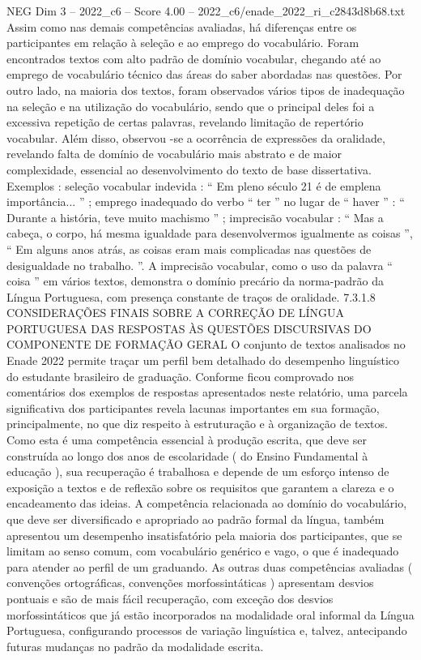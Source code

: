 \begin{textsample}{NEG Dim 3 – 2022\_c6 – Score 4.00 – 2022\_c6/enade\_2022\_ri\_c2843d8b68.txt}
Assim como nas demais competências avaliadas, há diferenças entre os participantes em relação à seleção e ao emprego do vocabulário.
Foram encontrados textos com alto padrão de domínio vocabular, chegando até ao emprego de vocabulário técnico das áreas do saber abordadas nas questões.
Por outro lado, na maioria dos textos, foram observados vários tipos de inadequação na seleção e na utilização do vocabulário, sendo que o principal deles foi a excessiva repetição de certas palavras, revelando limitação de repertório vocabular.
Além disso, observou -se a ocorrência de expressões da oralidade, revelando falta de domínio de vocabulário mais abstrato e de maior complexidade, essencial ao desenvolvimento do texto de base dissertativa.
Exemplos : seleção vocabular indevida : “ Em pleno século 21 é de emplena importância... ” ; emprego inadequado do verbo “ ter ” no lugar de “ haver ” : “ Durante a história, teve muito machismo ” ; imprecisão vocabular : “ Mas a cabeça, o corpo, há mesma igualdade para desenvolvermos igualmente as coisas ”, “ Em alguns anos atrás, as coisas eram mais complicadas nas questões de desigualdade no trabalho. ”.
A imprecisão vocabular, como o uso da palavra “ coisa ” em vários textos, demonstra o domínio precário da norma-padrão da Língua Portuguesa, com presença constante de traços de oralidade. 7.3.1.8 CONSIDERAÇÕES FINAIS SOBRE A CORREÇÃO DE LÍNGUA PORTUGUESA DAS RESPOSTAS ÀS QUESTÕES DISCURSIVAS DO COMPONENTE DE FORMAÇÃO GERAL O conjunto de textos analisados no Enade 2022 permite traçar um perfil bem detalhado do desempenho linguístico do estudante brasileiro de graduação.
Conforme ficou comprovado nos comentários dos exemplos de respostas apresentados neste relatório, uma parcela significativa dos participantes revela lacunas importantes em sua formação, principalmente, no que diz respeito à estruturação e à organização de textos.
Como esta é uma competência essencial à produção escrita, que deve ser construída ao longo dos anos de escolaridade ( do Ensino Fundamental à educação ), sua recuperação é trabalhosa e depende de um esforço intenso de exposição a textos e de reflexão sobre os requisitos que garantem a clareza e o encadeamento das ideias.
A competência relacionada ao domínio do vocabulário, que deve ser diversificado e apropriado ao padrão formal da língua, também apresentou um desempenho insatisfatório pela maioria dos participantes, que se limitam ao senso comum, com vocabulário genérico e vago, o que é inadequado para atender ao perfil de um graduando.
As outras duas competências avaliadas ( convenções ortográficas, convenções morfossintáticas ) apresentam desvios pontuais e são de mais fácil recuperação, com exceção dos desvios morfossintáticos que já estão incorporados na modalidade oral informal da Língua Portuguesa, configurando processos de variação linguística e, talvez, antecipando futuras mudanças no padrão da modalidade escrita.

\end{textsample}
